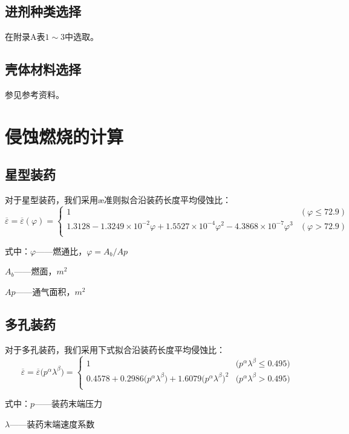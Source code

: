 \subsection{进剂种类选择}

在附录A表$1\sim3$中选取。

\subsection{壳体材料选择}


参见参考资料\citep{wangyouyuan}。

\section{侵蚀燃烧的计算}

\subsection{星型装药}

对于星型装药，我们采用æ准则拟合沿装药长度平均侵蚀比：
\[
    \overline{\varepsilon }=\overline{\varepsilon }\left( \varphi \right) =\left\{ \begin{matrix}
        1&		(\varphi \le 72.9)\\
        1.3128-1.3249\times 10^{-2}\varphi +1.5527\times 10^{-4}\varphi ^2-4.3868\times 10^{-7}\varphi ^3&		(\varphi >72.9)\\
    \end{matrix} \right. 
\]

式中：$\varphi$——燃通比，$\varphi=A_{b}/A{p}$

\qquad\quad$A_{b}$——燃面，$m^{2}$

\qquad\quad$A{p}$——通气面积，$m^{2}$

\subsection{多孔装药}

对于多孔装药，我们采用下式拟合沿装药长度平均侵蚀比：
\[
  \overline{\varepsilon }=\overline{\varepsilon }\bigl( p^{\alpha}\lambda ^{\beta} \bigr) =\left\{ \begin{matrix}
    1&		\bigl( p^{\alpha}\lambda ^{\beta}\le 0.495 \bigr)\\
    0.4578+0.2986\bigl( p^{\alpha}\lambda ^{\beta} \bigr) +1.6079\bigl( p^{\alpha}\lambda ^{\beta} \bigr) ^2&		\bigl( p^{\alpha}\lambda ^{\beta}>0.495 \bigr)\\
  \end{matrix} \right. 
\]

式中：$p$——装药末端压力

\qquad\quad$\lambda $——装药末端速度系数